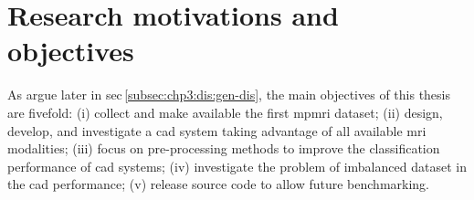 \section{Research motivations and objectives}\label{sec:intro:motivation}

As argue later in \acs{sec}\,\ref{subsec:chp3:dis:gen-dis}, the main objectives of this thesis are fivefold: (i) collect and make available the first \ac{mpmri} dataset; (ii) design, develop, and investigate a \ac{cad} system taking advantage of all available \ac{mri} modalities; (iii) focus on pre-processing methods to improve the classification performance of \ac{cad} systems; (iv) investigate the problem of imbalanced dataset in the \ac{cad} performance; (v) release source code to allow future benchmarking.
